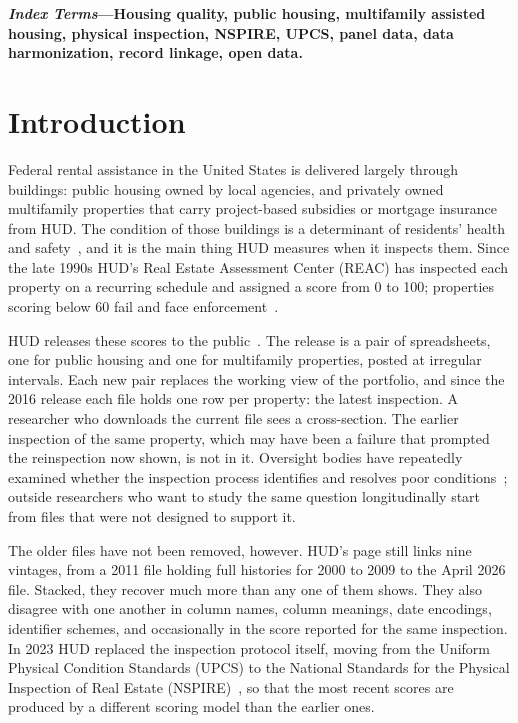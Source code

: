 \documentclass[10pt,twocolumn,letterpaper]{article}
\begin{document}
\vspace{1.0ex}
\noindent\textbf{\textit{Index Terms}---Housing quality, public housing, multifamily assisted housing, physical inspection, NSPIRE, UPCS, panel data, data harmonization, record linkage, open data.}

\section{Introduction}
Federal rental assistance in the United States is delivered largely through buildings: public housing owned by local agencies, and privately owned multifamily properties that carry project-based subsidies or mortgage insurance from HUD. The condition of those buildings is a determinant of residents' health and safety~\cite{krieger2002,jacobs2011,swope2019}, and it is the main thing HUD measures when it inspects them. Since the late 1990s HUD's Real Estate Assessment Center (REAC) has inspected each property on a recurring schedule and assigned a score from 0 to 100; properties scoring below 60 fail and face enforcement~\cite{cfr5g,gao2019}.

HUD releases these scores to the public~\cite{hudpis}. The release is a pair of spreadsheets, one for public housing and one for multifamily properties, posted at irregular intervals. Each new pair replaces the working view of the portfolio, and since the 2016 release each file holds one row per property: the latest inspection. A researcher who downloads the current file sees a cross-section. The earlier inspection of the same property, which may have been a failure that prompted the reinspection now shown, is not in it. Oversight bodies have repeatedly examined whether the inspection process identifies and resolves poor conditions~\cite{gao2001,gao2019,oig2024}; outside researchers who want to study the same question longitudinally start from files that were not designed to support it.

The older files have not been removed, however. HUD's page still links nine vintages, from a 2011 file holding full histories for 2000 to 2009 to the April 2026 file. Stacked, they recover much more than any one of them shows. They also disagree with one another in column names, column meanings, date encodings, identifier schemes, and occasionally in the score reported for the same inspection. In 2023 HUD replaced the inspection protocol itself, moving from the Uniform Physical Condition Standards (UPCS) to the National Standards for the Physical Inspection of Real Estate (NSPIRE)~\cite{nspirerule,nspirescoring}, so that the most recent scores are produced by a different scoring model than the earlier ones.
\end{document}
